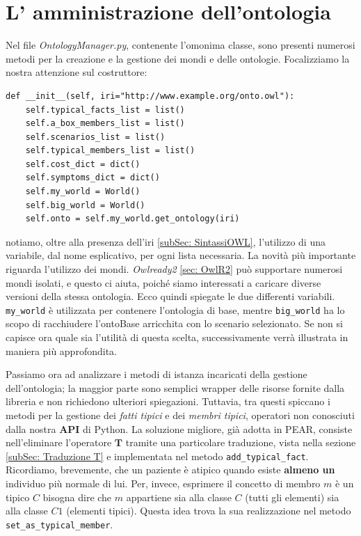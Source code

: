 \section{L' amministrazione dell'ontologia}
Nel file \emph{OntologyManager.py}, contenente l'omonima classe, sono presenti numerosi metodi per
la creazione e la gestione dei mondi e delle ontologie. Focalizziamo la nostra attenzione sul costruttore:
\begin{verbatim}
def __init__(self, iri="http://www.example.org/onto.owl"):
	self.typical_facts_list = list()
	self.a_box_members_list = list()
	self.scenarios_list = list()
	self.typical_members_list = list()
	self.cost_dict = dict()
	self.symptoms_dict = dict()
	self.my_world = World()
	self.big_world = World()
	self.onto = self.my_world.get_ontology(iri)
\end{verbatim}
notiamo, oltre alla presenza dell'iri \ref{subSec: SintassiOWL}, l'utilizzo di una variabile, dal nome esplicativo, 
per ogni lista necessaria. La novità più importante riguarda l'utilizzo dei mondi. \textit{Owlready2 }
\ref{sec: OwlR2} può supportare numerosi mondi isolati, e questo ci aiuta, poiché siamo interessati a caricare
diverse versioni della stessa ontologia. Ecco quindi spiegate le due differenti variabili.
\texttt{my_world} è utilizzata per contenere l'ontologia di base, mentre
\texttt{big_world} ha lo scopo di racchiudere l'ontoBase arricchita con lo scenario selezionato.
Se non si capisce ora quale sia l'utilità di questa scelta, successivamente verrà illustrata in maniera più approfondita.

Passiamo ora ad analizzare i metodi di istanza incaricati della gestione dell'ontologia; la maggior parte sono semplici wrapper delle risorse fornite dalla libreria e non richiedono ulteriori spiegazioni. Tuttavia, 
tra questi spiccano i metodi per la gestione dei \textit{fatti tipici} e dei \textit{membri tipici}, 
operatori non conosciuti dalla nostra \textbf{API} di Python.
La soluzione migliore, già adotta in PEAR, consiste nell'eliminare l'operatore $ \mathbf T $ tramite una
particolare traduzione, vista nella sezione \ref{subSec: Traduzione T} e implementata nel metodo 
\texttt{add_typical_fact}.
Ricordiamo, brevemente, che un paziente è atipico quando esiste \textbf{almeno un} individuo più normale di lui.
Per, invece, esprimere il concetto di membro $ m $ è un tipico $ C $ bisogna dire che $ m $ appartiene sia
alla classe $ C $ (tutti gli elementi) sia alla classe $ C1 $ (elementi tipici).
Questa idea trova la sua realizzazione nel metodo \texttt{set_as_typical_member}.

